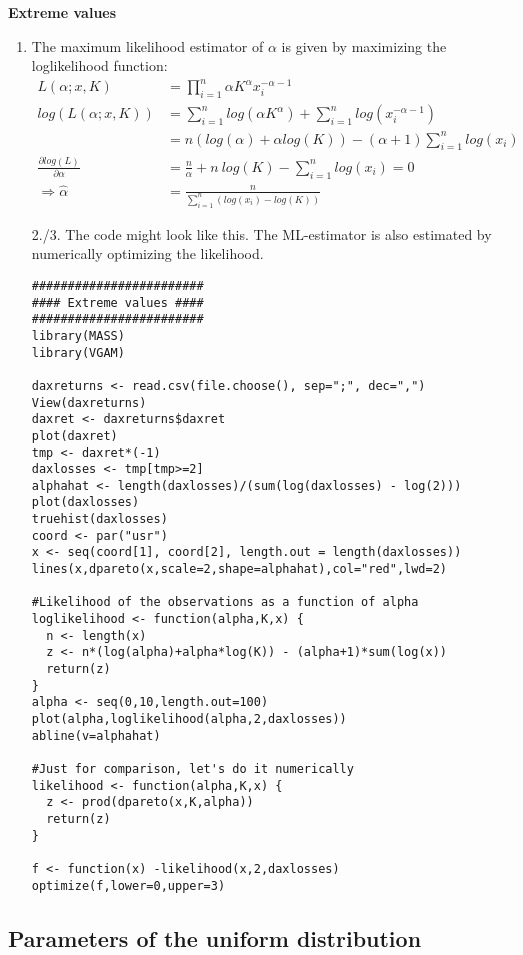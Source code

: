 \documentclass{article}
\begin{document}
\begin{solution}
\textbf{Extreme values}

\begin{enumerate}
\item The maximum likelihood estimator of $\alpha$ is given by maximizing
    the loglikelihood function:
\begin{align*}
  L(\alpha;x,K) &= \prod_{i=1}^n \alpha K^\alpha x_i^{-\alpha-1}\\
  log(L(\alpha;x,K))&= \sum_{i=1}^n log(\alpha K^\alpha) + \sum_{i=1}^n log(x_i^{-\alpha-1})\\
    & = n(log(\alpha)+ \alpha log(K)) - (\alpha+1) \sum_{i=1}^n log(x_i)\\
  \frac{\partial log(L)}{\partial \alpha} &= \frac{n}{\alpha} + n ~ log(K) - \sum_{i=1}^n log(x_i) = 0\\
  \Rightarrow \hat{\alpha} &= \frac{n}{\sum_{i=1}^n (log(x_i)-log(K))}
\end{align*}
\item[2./3.] The code might look like this. The ML-estimator is also estimated by numerically optimizing the likelihood.
\begin{verbatim}
########################
#### Extreme values ####
########################
library(MASS)
library(VGAM)

daxreturns <- read.csv(file.choose(), sep=";", dec=",")
View(daxreturns)
daxret <- daxreturns$daxret
plot(daxret)
tmp <- daxret*(-1)
daxlosses <- tmp[tmp>=2]
alphahat <- length(daxlosses)/(sum(log(daxlosses) - log(2)))
plot(daxlosses)
truehist(daxlosses)
coord <- par("usr")
x <- seq(coord[1], coord[2], length.out = length(daxlosses))
lines(x,dpareto(x,scale=2,shape=alphahat),col="red",lwd=2)

#Likelihood of the observations as a function of alpha
loglikelihood <- function(alpha,K,x) {
  n <- length(x)
  z <- n*(log(alpha)+alpha*log(K)) - (alpha+1)*sum(log(x))
  return(z)
}
alpha <- seq(0,10,length.out=100)
plot(alpha,loglikelihood(alpha,2,daxlosses))
abline(v=alphahat)

#Just for comparison, let's do it numerically
likelihood <- function(alpha,K,x) {
  z <- prod(dpareto(x,K,alpha))
  return(z)
}

f <- function(x) -likelihood(x,2,daxlosses)
optimize(f,lower=0,upper=3)
\end{verbatim}
\end{enumerate}
\end{solution}

\subsection{Parameters of the uniform distribution\label{mluniform}}
\end{document}
